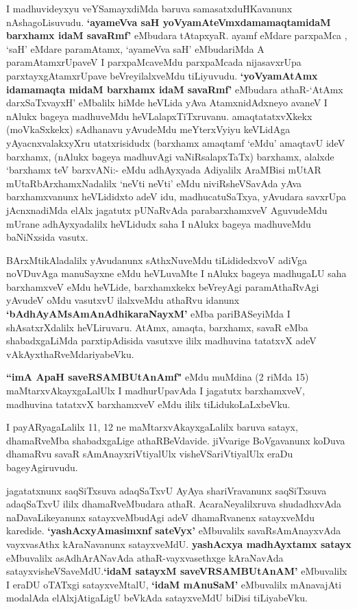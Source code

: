 \begin{artha}
 I madhuvideyxyu veYSamayxdiMda baruva samasatxduHKavanunx nAshagoLisuvudu. \textbf{`ayameVva saH yoV\s yamAteVmxdamamaqtamidaM barxhamx idaM savaRmf'} eMbudara tAtapxyaR. ayamf eMdare parxpaMca , `saH' eMdare paramAtamx, `ayameVva saH' eMbudariMda A paramAtamxrUpaveV I parxpaMcaveMdu parxpaMcada nijasavxrUpa parxtayxgAtamxrUpave beVreyilalxveMdu tiLiyuvudu. \textbf{`yoV\s yamAtAmx idamamaqta midaM barxhamx idaM savaRmf'} eMbudara athaR-`AtAmx darxSaTxvayxH' eMbalilx hiMde heVLida yAva AtamxnidAdxneyo avaneV I nAlukx bageya madhuveMdu heVLalapxTiTxruvanu. amaqtatatxvXkekx (moVkaSxkekx) sAdhanavu yAvudeMdu meYterxVyiyu keVLidAga yAyacnxvalakxyXru utatxrisidudx (barxhamx amaqtamf `eMdu' amaqtavU ideV barxhamx, (nAlukx bageya madhuvAgi vaNiRsalapxTaTx) barxhamx, alalxde `barxhamx teV barxvANi:- eMdu adhAyxyada Adiyalilx AraMBisi mUtAR mUtaRbArxhamxNadalilx `neVti neVti' eMdu niviRsheVSavAda yAva barxhamxvanunx heVLididxto adeV idu, madhucatuSaTxya,  yAvudara savxrUpa jAcnxnadiMda elAlx jagatutx pUNaRvAda parabarxhamxveV AguvudeMdu mUrane adhAyxyadalilx heVLidudx saha I nAlukx bageya madhuveMdu baNiNxsida vasutx.
\end{artha}

\begin{artha}
BArxMtikAladalilx yAvudanunx sAthxNuveMdu tiLididedxvoV adiVga noVDuvAga manuSayxne eMdu 
heVLuvaMte I nAlukx bageya madhugaLU saha barxhamxveV eMdu heVLide, barxhamxkekx 
beVreyAgi paramAthaRvAgi yAvudeV oMdu vasutxvU ilalxveMdu athaRvu idanunx 
\textbf{`bAdhAyAMsAmAnAdhikaraNayxM'} eMba pariBASeyiMda I shAsatxrXdalilx heVLiruvaru. AtAmx, 
amaqta, barxhamx, savaR eMba shabadxgaLiMda parxtipAdisida vasutxve ililx madhuvina 
tatatxvX adeV vAkAyxthaRveMdariyabeVku.

\textbf{``imA ApaH saveRSAMBUtAnAmf"} eMdu muMdina (2 riMda 15) maMtarxvAkayxgaLalUlx I madhurUpavAda I jagatutx barxhamxveV, madhuvina tatatxvX barxhamxveV eMdu ililx tiLidukoLaLxbeVku.
\end{artha}

\begin{artha}
I payARyagaLalilx 11, 12 ne maMtarxvAkayxgaLalilx baruva satayx, dhamaRveMba shabadxgaLige athaRBeVdavide. jiVvarige BoVgavanunx koDuva dhamaRvu savaR sAmAnayxriVtiyalUlx visheVSariVtiyalUlx eraDu bageyAgiruvudu.

jagatatxnunx saqSiTxsuva adaqSaTxvU AyAya shariVravanunx saqSiTxsuva adaqSaTxvU ililx dhamaRveMbudara  athaR. AcaraNeyalilxruva shudadhxvAda naDavaLikeyanunx satayxveMbudAgi adeV dhamaRvanenx satayxveMdu karedide. \textbf{`yashAcxyAmasimxnf sateVyx'} eMbuvalilx savaRsAmAnayxvAda vayxvasAthx kAraNavanunx satayxveMdU. \textbf{yashAcxya madhAyxtamx satayx} eMbuvalilx asAdhArANavAda athaR-vayxvasethxge kAraNavAda satayxvisheVSaveMdU.\textbf{`idaM satayxM saveVRSAMBUtAnAM'} eMbuvalilx I eraDU oTATxgi satayxveMtalU, \textbf{`idaM mAnuSaM'} eMbuvalilx mAnavajAti modalAda elAlxjAtigaLigU beVkAda satayxveMdU biDisi tiLiyabeVku.
\end{artha}

